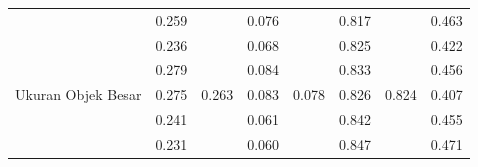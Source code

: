 \begin{table}[]
\begin{tabular}{|l|cc|cc|cc|c|}
                                                      & \multicolumn{1}{c|}{\cellcolor[HTML]{FFFFFF}0.259} & \cellcolor[HTML]{FFFFFF}                         & \multicolumn{1}{c|}{\cellcolor[HTML]{FFFFFF}0.076} & \cellcolor[HTML]{FFFFFF}                           & \multicolumn{1}{c|}{\cellcolor[HTML]{FFFFFF}0.817} & \cellcolor[HTML]{FFFFFF}                        & \multicolumn{1}{c|}{\cellcolor[HTML]{FFFFFF}0.463}   \\ \cline{2-2} \cline{4-4} \cline{6-6}
                                                      & \multicolumn{1}{c|}{\cellcolor[HTML]{FFFFFF}0.236} & \cellcolor[HTML]{FFFFFF}                         & \multicolumn{1}{c|}{\cellcolor[HTML]{FFFFFF}0.068} & \cellcolor[HTML]{FFFFFF}                           & \multicolumn{1}{c|}{\cellcolor[HTML]{FFFFFF}0.825} & \cellcolor[HTML]{FFFFFF}                        & \multicolumn{1}{c|}{\cellcolor[HTML]{FFFFFF}0.422}   \\ \cline{2-2} \cline{4-4} \cline{6-6}
                                                      & \multicolumn{1}{c|}{\cellcolor[HTML]{FFFFFF}0.279} & \cellcolor[HTML]{FFFFFF}                         & \multicolumn{1}{c|}{\cellcolor[HTML]{FFFFFF}0.084} & \cellcolor[HTML]{FFFFFF}                           & \multicolumn{1}{c|}{\cellcolor[HTML]{FFFFFF}0.833} & \cellcolor[HTML]{FFFFFF}                        & \multicolumn{1}{c|}{\cellcolor[HTML]{FFFFFF}0.456}   \\ \cline{2-2} \cline{4-4} \cline{6-6}
  \multirow{-5}{*}{Ukuran Objek Besar}                & \multicolumn{1}{c|}{\cellcolor[HTML]{FFFFFF}0.275} & \multirow{-5}{*}{\cellcolor[HTML]{FFFFFF}0.263}  & \multicolumn{1}{c|}{\cellcolor[HTML]{FFFFFF}0.083} & \multirow{-5}{*}{\cellcolor[HTML]{FFFFFF}0.078}    & \multicolumn{1}{c|}{\cellcolor[HTML]{FFFFFF}0.826} & \multirow{-5}{*}{\cellcolor[HTML]{FFFFFF}0.824} & \multicolumn{1}{c|}{\cellcolor[HTML]{FFFFFF}0.407}   \\ \hline
                                                      & \multicolumn{1}{c|}{\cellcolor[HTML]{FFFFFF}0.241} & \cellcolor[HTML]{FFFFFF}                         & \multicolumn{1}{c|}{\cellcolor[HTML]{FFFFFF}0.061} & \cellcolor[HTML]{FFFFFF}                           & \multicolumn{1}{c|}{\cellcolor[HTML]{FFFFFF}0.842} & \cellcolor[HTML]{FFFFFF}                        & \multicolumn{1}{c|}{\cellcolor[HTML]{FFFFFF}0.455}   \\ \cline{2-2} \cline{4-4} \cline{6-6}
                                                      & \multicolumn{1}{c|}{\cellcolor[HTML]{FFFFFF}0.231} & \cellcolor[HTML]{FFFFFF}                         & \multicolumn{1}{c|}{\cellcolor[HTML]{FFFFFF}0.060} & \cellcolor[HTML]{FFFFFF}                           & \multicolumn{1}{c|}{\cellcolor[HTML]{FFFFFF}0.847} & \cellcolor[HTML]{FFFFFF}                        & \multicolumn{1}{c|}{\cellcolor[HTML]{FFFFFF}0.471}   \\ \cline{2-2} \cline{4-4} \cline{6-6}

\end{tabular}
\end{table}
